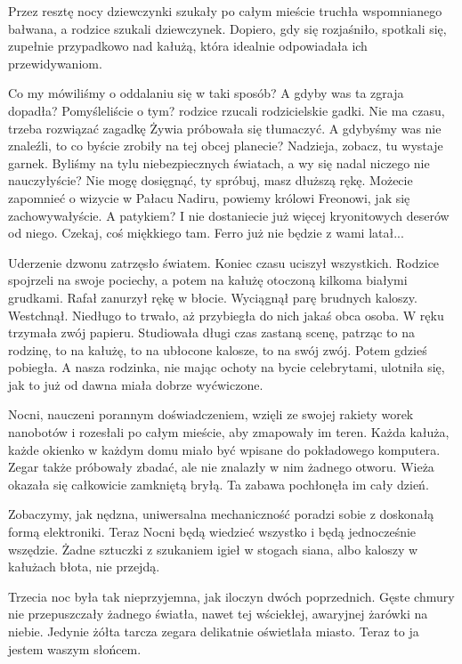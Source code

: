 Przez resztę nocy dziewczynki szukały po całym mieście truchła wspomnianego bałwana, a rodzice szukali dziewczynek.
Dopiero, gdy się rozjaśniło, spotkali się, zupełnie przypadkowo nad kałużą, która idealnie odpowiadała ich przewidywaniom.
\begin{dialogue}
	\ds{} Co my mówiliśmy o oddalaniu się w taki sposób?
	\ds{} A gdyby was ta zgraja dopadła? Pomyśleliście o tym? \dm{} rodzice rzucali rodzicielskie gadki.
	\ds{} Nie ma czasu, trzeba rozwiązać zagadkę \dm{} Żywia próbowała się tłumaczyć.
	\ds{} A gdybyśmy was nie znaleźli, to co byście zrobiły na tej obcej planecie?
	\ds{} Nadzieja, zobacz, tu wystaje garnek.
	\ds{} Byliśmy na tylu niebezpiecznych światach, a wy się nadal niczego nie nauczyłyście?
	\ds{} Nie mogę dosięgnąć, ty spróbuj, masz dłuższą rękę.
	\ds{} Możecie zapomnieć o wizycie w Pałacu Nadiru, powiemy królowi Freonowi, jak się zachowywałyście.
	\ds{} A patykiem?
	\ds{} I nie dostaniecie już więcej kryonitowych deserów od niego.
	\ds{} Czekaj, coś miękkiego tam.
	\ds{} Ferro już nie będzie z wami latał...
\end{dialogue}

Uderzenie dzwonu zatrzęsło światem.
Koniec czasu uciszył wszystkich.
Rodzice spojrzeli na swoje pociechy, a potem na kałużę otoczoną kilkoma białymi grudkami.
Rafał zanurzył rękę w błocie.
Wyciągnął parę brudnych kaloszy.
Westchnął.
Niedługo to trwało, aż przybiegła do nich jakaś obca osoba. W ręku trzymała zwój papieru.
Studiowała długi czas zastaną scenę, patrząc to na rodzinę, to na kałużę, to na ubłocone kalosze, to na swój zwój.
Potem gdzieś pobiegła.
A nasza rodzinka, nie mając ochoty na bycie celebrytami, ulotniła się, jak to już od dawna miała dobrze wyćwiczone.

Nocni, nauczeni porannym doświadczeniem, wzięli ze swojej rakiety worek nanobotów i rozesłali po całym mieście, aby zmapowały im teren. 
Każda kałuża, każde okienko w każdym domu miało być wpisane do pokładowego komputera.
Zegar także próbowały zbadać, ale nie znalazły w nim żadnego otworu. 
Wieża okazała się całkowicie zamkniętą bryłą.
Ta zabawa pochłonęła im cały dzień.

Zobaczymy, jak nędzna, uniwersalna mechaniczność poradzi sobie z doskonałą formą elektroniki.
Teraz Nocni będą wiedzieć wszystko i będą jednocześnie wszędzie.
Żadne sztuczki z szukaniem igieł w stogach siana, albo kaloszy w kałużach błota, nie przejdą.

Trzecia noc była tak nieprzyjemna, jak iloczyn dwóch poprzednich.
Gęste chmury nie przepuszczały żadnego światła, nawet tej wściekłej, awaryjnej żarówki na niebie.
Jedynie żółta tarcza zegara delikatnie oświetlała miasto.
Teraz to ja jestem waszym słońcem.

